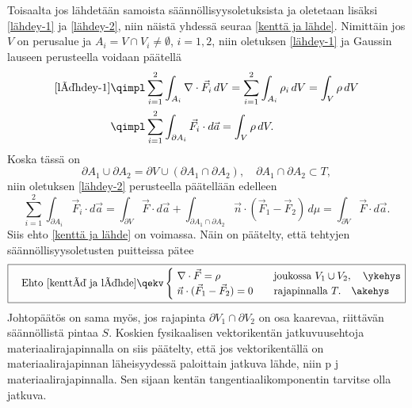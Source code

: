 Toisaalta jos lähdetään samoista säännöllisyysoletuksista ja oletetaan lisäksi \eqref{lähdey-1}
ja \eqref{lähdey-2}, niin näistä yhdessä seuraa \eqref{kenttä ja lähde}. Nimittäin jos 
$V$ on perusalue ja $A_i = V \cap V_i \neq \emptyset$, $i=1,2$, niin oletuksen \eqref{lähdey-1}
ja Gaussin lauseen perusteella voidaan päätellä
\begin{align*}
\text{\eqref{lähdey-1}} &\qimpl \sum_{i=1}^2 \int_{A_i} \nabla\cdot\vec F_i\,dV 
                                     = \sum_{i=1}^2 \int_{A_i} \rho_i\,dV = \int_V \rho\,dV \\
                        &\qimpl \sum_{i=1}^2 \int_{\partial A_i} \vec F_i\cdot d\vec a 
                                     = \int_V \rho\,dV.
\end{align*}
Koska tässä on
\[ 
\partial A_1 \cup \partial A_2 = \partial V \cup (\partial A_1 \cap \partial A_2), \quad
\partial A_1 \cap \partial A_2 \subset T, 
\]
niin oletuksen \eqref{lähdey-2} perusteella päätellään edelleen
\[
\sum_{i=1}^2 \int_{\partial A_i} \vec F_i\cdot d\vec a 
     = \int_{\partial V} \vec F\cdot d\vec a 
           + \int_{\partial A_1 \cap \partial A_2} \vec n\cdot(\vec F_1-\vec F_2)\,d\mu
     = \int_{\partial V} \vec F\cdot d\vec a.
\]
Siis ehto \eqref{kenttä ja lähde} on voimassa. Näin on päätelty, että tehtyjen
säännöllisyysoletusten puitteissa pätee
\[ \boxed{
\quad \text{Ehto \eqref{kenttä ja lähde}} \qekv 
      \begin{cases} 
      \ \nabla\cdot\vec F = \rho \quad          &\text{joukossa}\ V_1 \cup V_2, \quad\ykehys \\
      \ \vec n\cdot(\vec F_1-\vec F_2)= 0 \quad &\text{rajapinnalla}\ T. \quad\akehys
      \end{cases} }
\]
Johtopäätös on sama myös, jos rajapinta $\partial V_1 \cap \partial V_2$ on osa kaarevaa, 
riittävän säännöllistä pintaa $S$. Koskien fysikaalisen vektorikentän jatkuvuusehtoja
materiaalirajapinnalla on siis päätelty, että jos vektorikentällä on materiaalirajapinnan
läheisyydessä paloittain jatkuva lähde, niin  p
 j materiaalirajapinnalla. Sen sijaan kentän tangentiaalikomponentin 
 tarvitse olla jatkuva.

